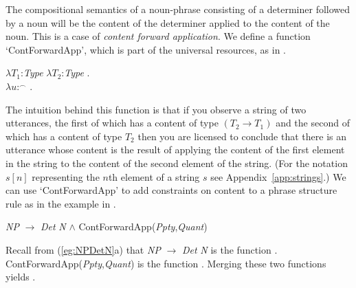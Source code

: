 The compositional semantics of a noun-phrase consisting of a
determiner followed by a noun will be the content of the determiner
applied to the content of the noun.  This is a case of \textit{content
  forward application}.  We define a function `ContForwardApp', which is
part of the universal resources, as in \nexteg{}.
\begin{ex} 
$\lambda T_1$:\textit{Type} $\lambda T_2$:\textit{Type} . \\
\hspace*{1em}$\lambda
u$:$^{\frown}$ . \\
\hspace*{2em}
\label{ex:ContForwardApp}
\end{ex} 
The intuition behind this function is that if you observe a string of
two utterances, the first of which has a content of type
$(T_2\rightarrow T_1)$ and the second of which has a content of type
$T_2$ then you are licensed to conclude that there is an utterance
whose content is the result of applying the content of the first
element in the string to the content of the second element of the
string. (For the notation $s[n]$ representing the $n$th element of a
string $s$ see Appendix~\ref{app:strings}.)  We can use
`ContForwardApp' to add constraints on content to a phrase structure
rule as in the example in \nexteg{}.
\begin{ex} 
\textit{NP} $\longrightarrow$ \textit{Det} \textit{N} \d{\d{$\wedge$}} ContForwardApp(\textit{Ppty},\textit{Quant}) 
\end{ex} 
Recall from (\ref{eg:NPDetN}a) that  \textit{NP} $\longrightarrow$
\textit{Det} \textit{N} is the function
. ContForwardApp(\textit{Ppty},\textit{Quant}) is the
function .  Merging these two functions yields .
